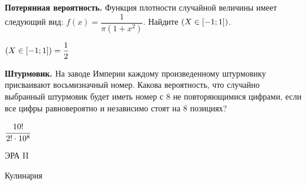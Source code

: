\documentclass[12pt, addpoints]{exam} %
\let\P\relax
\DeclareMathOperator{\P}{\mathbb{P}}
\begin{document}
\begin{questions}
\question \textbf{Потерянная вероятность.} Функция плотности случайной величины имеет следующий вид: $f(x)=\dfrac{1}{\pi(1+x^2)}$. Найдите $\P(X\in[-1;1])$.
\begin{solution}
$\P(X\in[-1;1])=\dfrac{1}{2}$
\end{solution}

\question \textbf{Штурмовик.} На заводе Империи каждому произведенному штурмовику присваивают восьмизначный номер. Какова вероятность, что случайно выбранный штурмовик будет иметь номер с $8$ не повторяющимися цифрами, если все цифры равновероятно и независимо стоят на $8$ позициях?
\begin{solution}
$\cfrac{10!}{2! \cdot 10^8}$
\end{solution}




\end{questions}


\newpage
\begin{center}
ЭРА II
\end{center}

\begin{center}
Кулинария
\end{center}
\end{document}
